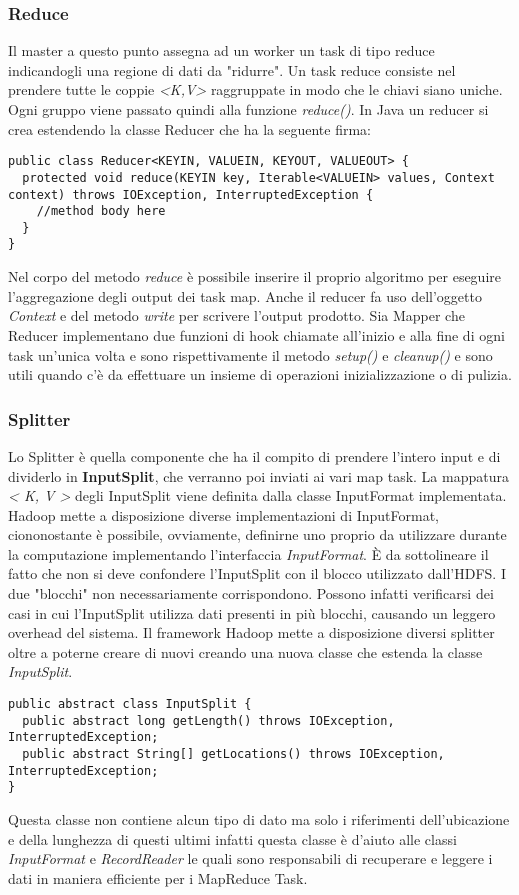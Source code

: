 \subsubsection{Reduce}
Il master a questo punto assegna ad un worker un task di tipo reduce indicandogli una regione di dati da "ridurre". Un task reduce consiste nel prendere tutte le coppie \textit{<K,V>} raggruppate in modo che le chiavi siano uniche. Ogni gruppo viene passato quindi alla funzione \textit{reduce()}. In Java un reducer si crea estendendo la classe Reducer che ha la seguente firma:
\begin{lstlisting}
public class Reducer<KEYIN, VALUEIN, KEYOUT, VALUEOUT> {
  protected void reduce(KEYIN key, Iterable<VALUEIN> values, Context context) throws IOException, InterruptedException {
    //method body here
  }
}
\end{lstlisting}
Nel corpo del metodo \textit{reduce} è possibile inserire il proprio algoritmo per eseguire l'aggregazione degli output dei task map. Anche il reducer fa uso dell'oggetto \textit{Context} e del metodo \textit{write} per scrivere l'output prodotto. Sia Mapper che Reducer implementano due funzioni di hook chiamate all'inizio e alla fine di ogni task un'unica volta e sono rispettivamente il metodo \textit{setup()} e \textit{cleanup()} e sono utili quando c'è da effettuare un insieme di operazioni inizializzazione o di pulizia.
\subsubsection{Splitter}
Lo Splitter è quella componente che ha il compito di prendere l'intero input e di dividerlo in \textbf{InputSplit}, che verranno poi inviati ai vari map task. La mappatura \textit{< K, V >} degli InputSplit viene definita dalla classe InputFormat implementata. Hadoop mette a disposizione diverse implementazioni di InputFormat, ciononostante è possibile, ovviamente, definirne uno proprio da utilizzare durante la computazione implementando l'interfaccia \textit{InputFormat}. È da sottolineare il fatto che non si deve confondere l'InputSplit con il blocco utilizzato dall'HDFS. I due "blocchi" non necessariamente corrispondono. Possono infatti verificarsi dei casi in cui l'InputSplit utilizza dati presenti in più blocchi, causando un leggero overhead del sistema. Il framework Hadoop mette a disposizione diversi splitter oltre a poterne creare di nuovi creando una nuova classe che estenda la classe \textit{InputSplit}.
\begin{lstlisting}
public abstract class InputSplit {
  public abstract long getLength() throws IOException, InterruptedException;
  public abstract String[] getLocations() throws IOException, InterruptedException;
}
\end{lstlisting}
Questa classe non contiene alcun tipo di dato ma solo i riferimenti dell'ubicazione e della lunghezza di questi ultimi infatti questa classe è d'aiuto alle classi \textit{InputFormat} e \textit{RecordReader} le quali sono responsabili di recuperare e leggere i dati in maniera efficiente per i MapReduce Task.

